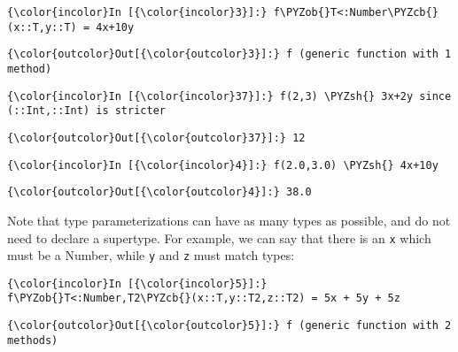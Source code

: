 \documentclass[11pt]{article}
\def\PYZob{\char`\{}
\def\PYZcb{\char`\}}
\def\PYZsh{\char`\#}
\begin{document}
    \begin{Verbatim}[commandchars=\\\{\}]
{\color{incolor}In [{\color{incolor}3}]:} f\PYZob{}T<:Number\PYZcb{}(x::T,y::T) = 4x+10y
\end{Verbatim}

            \begin{Verbatim}[commandchars=\\\{\}]
{\color{outcolor}Out[{\color{outcolor}3}]:} f (generic function with 1 method)
\end{Verbatim}
        
    \begin{Verbatim}[commandchars=\\\{\}]
{\color{incolor}In [{\color{incolor}37}]:} f(2,3) \PYZsh{} 3x+2y since (::Int,::Int) is stricter
\end{Verbatim}

            \begin{Verbatim}[commandchars=\\\{\}]
{\color{outcolor}Out[{\color{outcolor}37}]:} 12
\end{Verbatim}
        
    \begin{Verbatim}[commandchars=\\\{\}]
{\color{incolor}In [{\color{incolor}4}]:} f(2.0,3.0) \PYZsh{} 4x+10y
\end{Verbatim}

            \begin{Verbatim}[commandchars=\\\{\}]
{\color{outcolor}Out[{\color{outcolor}4}]:} 38.0
\end{Verbatim}
        
    Note that type parameterizations can have as many types as possible, and
do not need to declare a supertype. For example, we can say that there
is an \texttt{x} which must be a Number, while \texttt{y} and \texttt{z}
must match types:

    \begin{Verbatim}[commandchars=\\\{\}]
{\color{incolor}In [{\color{incolor}5}]:} f\PYZob{}T<:Number,T2\PYZcb{}(x::T,y::T2,z::T2) = 5x + 5y + 5z
\end{Verbatim}

            \begin{Verbatim}[commandchars=\\\{\}]
{\color{outcolor}Out[{\color{outcolor}5}]:} f (generic function with 2 methods)
\end{Verbatim}
        
\end{document}
